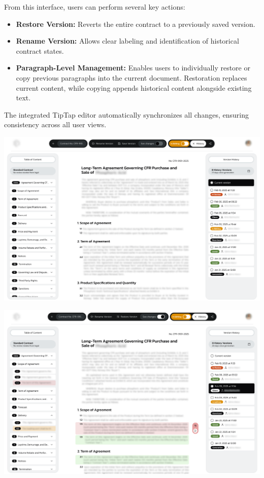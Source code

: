 From this interface, users can perform several key actions:

\begin{itemize}
    \item \textbf{Restore Version:} Reverts the entire contract to a previously saved version.
    \item \textbf{Rename Version:} Allows clear labeling and identification of historical contract states.
    \item \textbf{Paragraph-Level Management:} Enables users to individually restore or copy previous paragraphs into the current document. Restoration replaces current content, while copying appends historical content alongside existing text.
\end{itemize}

The integrated TipTap editor automatically synchronizes all changes, ensuring consistency across all user views.

\begin{center}
    \centering
    \includegraphics[width=1\textwidth]{Images/Contract History - Contract Versions.png}
    \label{fig:contract_history_interface}
\end{center}

\begin{center}
    \centering
    \includegraphics[width=1\textwidth]{Images/Contract History - Paragraph Versions.png}
    \label{fig:track_changes_across_versions}
\end{center}

